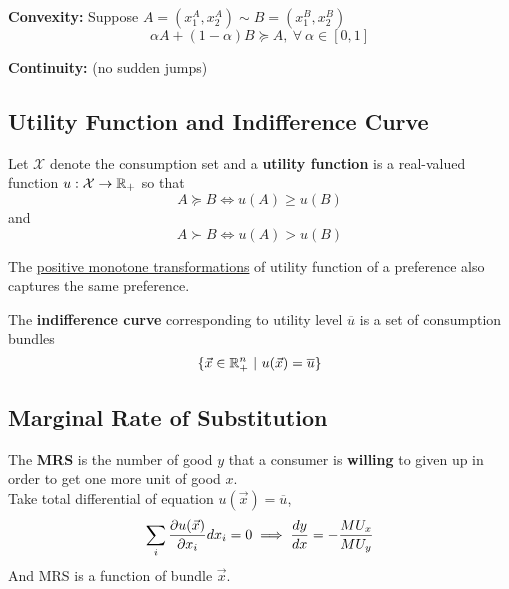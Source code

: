 \documentclass[]{article}
\begin{document}
            \begin{definition}
                \textbf{Convexity: } Suppose $A = (x_1^A, x_2^A) \sim B = (x_1^B, x_2^B)$
                \[
                    \alpha A + (1 - \alpha) B \succcurlyeq A,\ \forall \ \alpha \in [0, 1]
                \]
            \end{definition}
            
            \begin{definition}
                \textbf{Continuity: } (no sudden jumps)
            \end{definition}
        
        \subsection{Utility Function and Indifference Curve}
            \begin{definition}
                Let $\mathcal{X}$ denote the consumption set and a \textbf{utility function} is a real-valued function $u:\mathcal{X} \rightarrow \mathbb{R}_+$ so that
                \[
                    A \succcurlyeq B \iff u(A) \geq u(B)
                \]
                and
                \[
                    A \succ B \iff u(A) > u(B)
                \]
            \end{definition}
            
            \begin{remark}
                The \ul{positive monotone transformations} of utility function of a preference also captures the same preference. 
            \end{remark}
            
            \begin{definition}
                The \textbf{indifference curve} corresponding to utility level $\overline{u}$ is a set of consumption bundles
                \[
                    \{\vec{x} \in \mathbb{R}^n_+\ \vert\ u(\vec{x}) = \overline{u} \}
                \]
            \end{definition}
            
        \subsection{Marginal Rate of Substitution}
            \begin{definition}
                The \textbf{MRS} is the number of good $y$ that a consumer is \textbf{willing} to given up in order to get one more unit of good $x$.
                \\Take total differential of equation $u(\vec{x}) = \overline{u}$,
                \[
                    \sum_{i}{
                        \frac{\partial{u(\vec{x})}}{\partial{x_i}} d{x_i} = 0
                        }
                    \implies
                    \frac{dy}{dx} = -\frac{MU_x}{MU_y}
                \]
                And MRS is a function of bundle $\vec{x}$.
            \end{definition}
            
\end{document}
